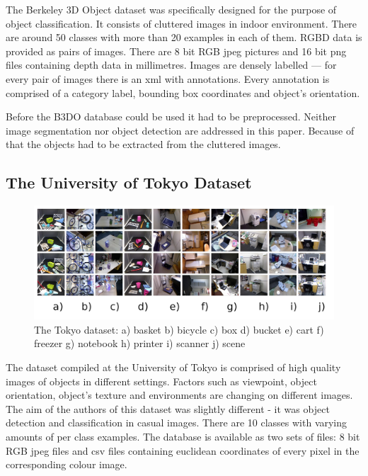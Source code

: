 	The Berkeley 3D Object dataset was specifically designed for the purpose of object classification. It consists of cluttered images in indoor environment. There are around 50 classes with more than 20 examples in each of them. RGBD data is provided as pairs of images. There are 8 bit RGB jpeg pictures and 16 bit png files containing depth data in millimetres. Images are densely labelled --- for every pair of images there is an xml with annotations. Every annotation is comprised of a category label, bounding box coordinates and object's orientation.

	Before the B3DO database could be used it had to be preprocessed. Neither image segmentation nor object detection are addressed in this paper. Because of that the objects had to be extracted from the cluttered images.

	\subsection{The University of Tokyo Dataset}	
	\begin{figure}[!ht]
	\centering
	\includegraphics[width=1\textwidth]{figs/tokyo_horizontal}
	\caption{The Tokyo dataset: a) basket b) bicycle c) box d) bucket e) cart f) freezer g) notebook h) printer i) scanner j) scene}
	\label{fig:tokyo}
	\end{figure}
	
	The dataset compiled at the University of Tokyo is comprised of high quality images of objects in different settings. Factors such as viewpoint, object orientation, object's texture and environments are changing on different images. The aim of the authors of this dataset was slightly different - it was object detection and classification in casual images. There are 10 classes with varying amounts of per class examples. The database is available as two sets of files: 8 bit RGB jpeg files and csv files containing euclidean coordinates of every pixel in the corresponding colour image.


